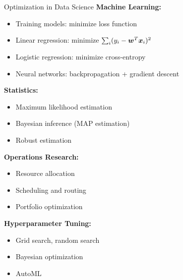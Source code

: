 \documentclass[aspectratio=169]{beamer}
\begin{document}
\begin{frame}{Optimization in Data Science}
  \textbf{Machine Learning:}
  \begin{itemize}
    \item Training models: minimize loss function
    \item Linear regression: minimize $\sum_i (y_i - \boldsymbol{w}^T\boldsymbol{x}_i)^2$
    \item Logistic regression: minimize cross-entropy
    \item Neural networks: backpropagation + gradient descent
  \end{itemize}

  \vspace{0.5em}

  \textbf{Statistics:}
  \begin{itemize}
    \item Maximum likelihood estimation
    \item Bayesian inference (MAP estimation)
    \item Robust estimation
  \end{itemize}

  \vspace{0.5em}

  \textbf{Operations Research:}
  \begin{itemize}
    \item Resource allocation
    \item Scheduling and routing
    \item Portfolio optimization
  \end{itemize}

  \vspace{0.5em}

  \textbf{Hyperparameter Tuning:}
  \begin{itemize}
    \item Grid search, random search
    \item Bayesian optimization
    \item AutoML
  \end{itemize}
\end{frame}
\end{document}
